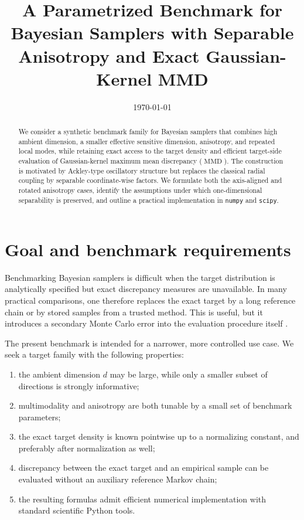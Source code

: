 \documentclass[11pt,a4paper]{article}
\title{A Parametrized Benchmark for Bayesian Samplers with Separable Anisotropy and Exact Gaussian-Kernel MMD}
\author{}
\date{\today}
\DeclareMathOperator{\MMDop}{MMD}
\newcommand{\MMD}{\ensuremath{\MMDop}\xspace}
\begin{document}
\maketitle

\begin{abstract}
We consider a synthetic benchmark family for Bayesian samplers that combines high ambient dimension, a smaller effective sensitive dimension, anisotropy, and repeated local modes, while retaining exact access to the target density and efficient target-side evaluation of Gaussian-kernel maximum mean discrepancy (\MMD). The construction is motivated by Ackley-type oscillatory structure but replaces the classical radial coupling by separable coordinate-wise factors. We formulate both the axis-aligned and rotated anisotropy cases, identify the assumptions under which one-dimensional separability is preserved, and outline a practical implementation in \texttt{numpy} and \texttt{scipy}.
\end{abstract}

\section{Goal and benchmark requirements}

Benchmarking Bayesian samplers is difficult when the target distribution is analytically specified but exact discrepancy measures are unavailable. In many practical comparisons, one therefore replaces the exact target by a long reference chain or by stored samples from a trusted method. This is useful, but it introduces a secondary Monte Carlo error into the evaluation procedure itself \parencite{Magnusson2025PosteriorDB,Ding2025MCBench}.

The present benchmark is intended for a narrower, more controlled use case. We seek a target family with the following properties:
\begin{enumerate}
    \item the ambient dimension $d$ may be large, while only a smaller subset of directions is strongly informative;
    \item multimodality and anisotropy are both tunable by a small set of benchmark parameters;
    \item the exact target density is known pointwise up to a normalizing constant, and preferably after normalization as well;
    \item discrepancy between the exact target and an empirical sample can be evaluated without an auxiliary reference Markov chain;
    \item the resulting formulas admit efficient numerical implementation with standard scientific Python tools.
\end{enumerate}
\end{document}
